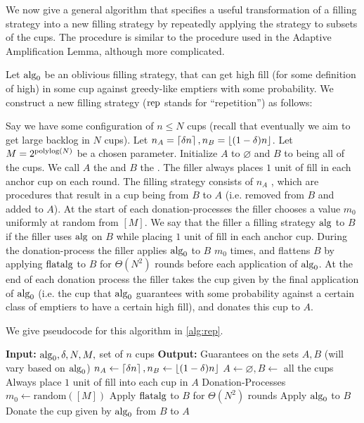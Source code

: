 We now give a general algorithm that specifies a useful
transformation of a filling strategy into a new filling strategy
by repeatedly applying the strategy to subsets of the cups. 
The procedure is similar to the procedure used in the Adaptive
Amplification Lemma, although more complicated.

\begin{definition}
  \label{def:rep}
  {\normalfont
  Let $\operatorname{\text{\textup{alg}}}_0$ be an oblivious filling strategy, that can get
  high fill (for some definition of high) in some cup against
  greedy-like emptiers with some probability. We construct a new
  filling strategy  ($\operatorname{\text{\textup{rep}}}$ stands
  for \enquote{repetition}) as follows:

  Say we have some configuration of $n\le N$ cups (recall that
  eventually we aim to get large backlog in $N$ cups).
  Let $n_A = \left\lceil \delta n \right\rceil, n_B = \left\lfloor (1-\delta)n \right\rfloor$. Let
  $M=2^{\operatorname{\text{polylog}}(N)}$ be a chosen parameter. 
  Initialize $A$ to $\varnothing$ and $B$ to
  being all of the cups. We call $A$ the  and
  $B$ the . The filler always places $1$
  unit of fill in each anchor cup on each round. The filling
  strategy consists of $n_A$ , which are
  procedures that result in a cup being  from $B$
  to $A$ (i.e. removed from $B$ and added to $A$). At the start
  of each donation-processes the filler chooses a value $m_0$
  uniformly at random from $[M]$. We say that the filler
   a filling strategy $\operatorname{\text{\textup{alg}}}$ to $B$ if the
  filler uses $\operatorname{\text{\textup{alg}}}$ on $B$ while placing $1$ unit of fill
  in each anchor cup. During the donation-process the filler
  applies $\operatorname{\text{\textup{alg}}}_0$ to $B$ $m_0$ times, and flattens $B$ by
  applying $\operatorname{\text{\textup{flatalg}}}$ to $B$ for $\Theta(N^2)$ rounds before each
  application of $\operatorname{\text{\textup{alg}}}_0$. At the end of each donation process
  the filler takes the cup given by the final application of
  $\operatorname{\text{\textup{alg}}}_0$ (i.e. the cup that $\operatorname{\text{\textup{alg}}}_0$ guarantees with some
  probability against a certain class of emptiers to have a
  certain high fill), and donates this cup to $A$. 

  We give pseudocode for this algorithm in \cref{alg:rep}.
 }

\begin{algorithm}
  \caption{$\rep_\delta(\alg_0)$}
  \label{alg:rep}
  \begin{algorithmic}
    \State \textbf{Input:} $\operatorname{\text{\textup{alg}}}_0, \delta, N, M, $ set of $n$ cups
    \State \textbf{Output:} Guarantees on the sets $A, B$ (will vary based on $\operatorname{\text{\textup{alg}}}_0$)
    \State
    \State $n_A \gets \left\lceil \delta n \right\rceil, n_B \gets \left\lfloor (1-\delta) n \right\rfloor$
    \State $A \gets \varnothing, B \gets$ all the cups
    \State Always place $1$ unit of fill into each cup in $A$
     \Comment Donation-Processes
    \State $m_0 \gets \text{random}([M])$
        \State Apply $\operatorname{\text{\textup{flatalg}}}$ to $B$ for $\Theta(N^2)$ rounds
        \State Apply $\operatorname{\text{\textup{alg}}}_0$ to $B$
      \EndFor
      \State Donate the cup given by $\operatorname{\text{\textup{alg}}}_0$ from $B$ to $A$
    \EndFor
  \end{algorithmic}
\end{algorithm}


\end{definition}
